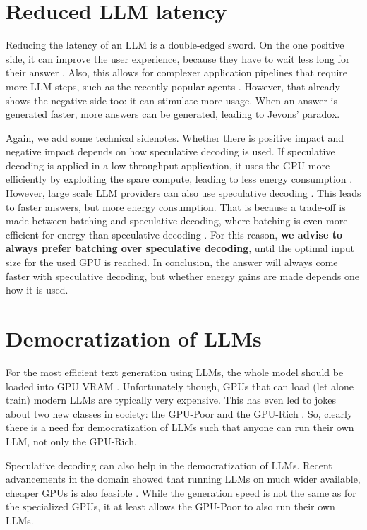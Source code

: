 \section{Reduced LLM latency}

Reducing the latency of an LLM is a double-edged sword. On the one positive side, it can improve the user experience, because they have to wait less long for their answer \cite{bamoria2025solving}. Also, this allows for complexer application pipelines that require more LLM steps, such as the recently popular agents \cite{chudleigh2025complete, suard2025quick}. However, that already shows the negative side too: it can stimulate more usage. When an answer is generated faster, more answers can be generated, leading to Jevons' paradox. %

Again, we add some technical sidenotes. Whether there is positive impact and negative impact depends on how speculative decoding is used. If speculative decoding is applied in a low throughput application, it uses the GPU more efficiently by exploiting the spare compute, leading to less energy consumption \cite{qin2024optimized}. However, large scale LLM providers can also use speculative decoding \cite{hassabis2025year, svirschevski2024specexec}. This leads to faster answers, but more energy consumption. That is because a trade-off is made between batching and speculative decoding, where batching is even more efficient for energy than speculative decoding \cite{fernandez2025energy}. For this reason, \textbf{we advise to always prefer batching over speculative decoding}, until the optimal input size for the used GPU is reached. In conclusion, the answer will always come faster with speculative decoding, but whether energy gains are made depends one how it is used.

\section{Democratization of LLMs}
For the most efficient text generation using LLMs, the whole model should be loaded into GPU VRAM \cite{chen2024practical}. Unfortunately though, GPUs that can load (let alone train) modern LLMs are typically very expensive. This has even led to jokes about two new classes in society: the GPU-Poor and the GPU-Rich \cite{envisioning2025gpu}. So, clearly there is a need for democratization of LLMs such that anyone can run their own LLM, not only the GPU-Rich.

Speculative decoding can also help in the democratization of LLMs. Recent advancements in the domain showed that running LLMs on much wider available, cheaper GPUs is also feasible \cite{svirschevski2024specexec}. While the generation speed is not the same as for the specialized GPUs, it at least allows the GPU-Poor to also run their own LLMs.

